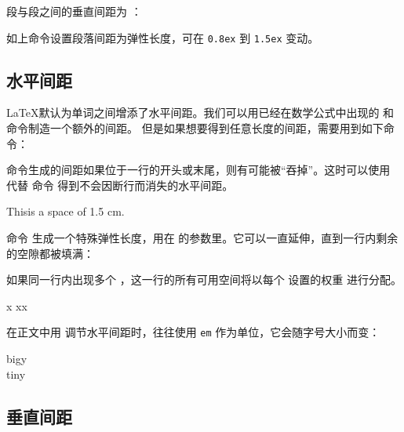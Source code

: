 段与段之间的垂直间距为 ：
\begin{command}
\end{command}

如上命令设置段落间距为弹性长度，可在 \texttt{0.8ex} 到 \texttt{1.5ex} 变动。

\subsection{水平间距}

\LaTeX 默认为单词之间增添了水平间距。我们可以用已经在数学公式中出现的  和  命令制造一个额外的间距。
但是如果想要得到任意长度的间距，需要用到如下命令：
\begin{command}
\end{command}

 命令生成的间距如果位于一行的开头或末尾，则有可能被“吞掉”。这时可以使用  代替  命令
得到不会因断行而消失的水平间距。

\begin{example}
This\hspace{1.5cm}is a space
of 1.5 cm.
\end{example}

命令  生成一个特殊弹性长度，用在  的参数里。它可以一直延伸，直到一行内剩余的空隙都被填满：
\begin{command}
\end{command}
如果同一行内出现多个 ，这一行的所有可用空间将以每个  设置的权重  进行分配。

\begin{example}
x
xx
\end{example}

在正文中用  调节水平间距时，往往使用 \texttt{em} 作为单位，它会随字号大小而变：

\begin{example}
{\Large{}big\hspace{1em}y}\\
{\tiny{}tin\hspace{1em}y}
\end{example}

\subsection{垂直间距}

